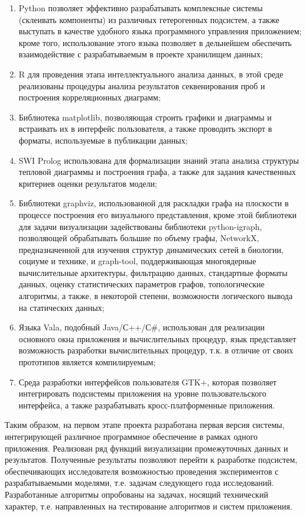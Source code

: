 \documentclass[a4paper,12pt,openany,final]{extreport}
\begin{document}
\begin{enumerate}
\def\labelenumi{\arabic{enumi}.}
\item
  Python позволяет эффективно разрабатывать комплексные системы
  (склеивать компоненты) из различных гетерогенных подсистем, а также
  выступать в качестве удобного языка программного управления
  приложением; кроме того, использование этого языка позволяет в
  дельнейшем обеспечить взаимодействие с разрабатываемым в проекте
  хранилищем данных;
\item
  R для проведения этапа интеллектуального анализа данных, в этой среде
  реализованы процедуры анализа результатов секвенирования проб и
  построения корреляционных диаграмм;
\item
  Библиотека matplotlib, позволяющая строить графики и диаграммы и
  встраивать их в интерфейс пользователя, а также проводить экспорт в
  форматы, используемые в публикации данных;
\item
  SWI Prolog использована для формализации знаний этапа анализа
  структуры тепловой диаграммы и построения графа, а также для задания
  качественных критериев оценки результатов модели;
\item
  Библиотеки graphviz, использованной для раскладки графа на плоскости в
  процессе построения его визуального представления, кроме этой
  библиотеки для задачи визуализации задействованы библиотеки
  python-igraph, позволяющей обрабатывать большие по объему графы,
  NetworkX, предназначенной для изучения структур динамических сетей в
  биологии, социуме и технике, и graph-tool, поддерживающая многоядерные
  вычислительные архитектуры, фильтрацию данных, стандартные форматы
  данных, оценку статистических параметров графов, топологические
  алгоритмы, а также, в некоторой степени, возможности логического
  вывода на статических данных;
\item
  Языка Vala, подобный Java/С++/С\#, использован для реализации
  основного окна приложения и вычислительных процедур, язык представляет
  возможность разработки вычислительных процедур, т.к. в отличие от
  своих прототипов является компилируемым;
\item
  Среда разработки интерфейсов пользователя GTK+, которая позволяет
  интегрировать подсистемы приложения на уровне пользовательского
  интерфейса, а также разрабатывать кросс-платформенные приложения.
\end{enumerate}

Таким образом, на первом этапе проекта разработана первая версия
системы, интегрирующей различное программное обеспечение в рамках одного
приложения. Реализован ряд функций визуализации промежуточных данных и
результатов. Полученные результаты позволяют перейти к разработке
подсистем, обеспечивающих исследователя возможностью проведения
экспериментов с разрабатываемыми моделями, т.е. задачам следующего года
исследований. Разработанные алгоритмы опробованы на задачах, носящий
технический характер, т.е. направленных на тестирование алгоритмов и
систем приложения.
\end{document}
